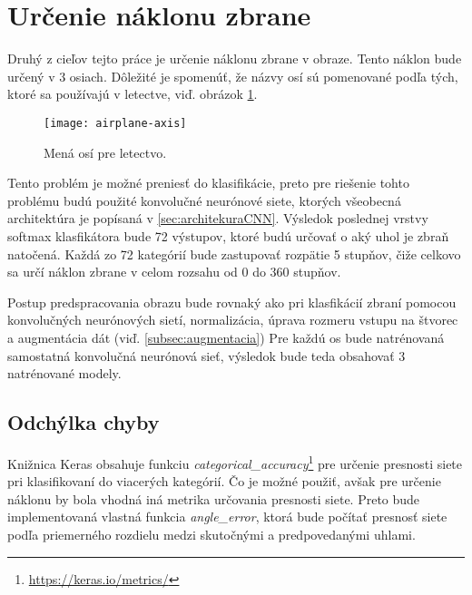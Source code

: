 
\section{Určenie náklonu zbrane}
\label{sec:urcenienaklonuzbrane}
Druhý z cieľov tejto práce je určenie náklonu zbrane v obraze.
Tento náklon bude určený v 3 osiach.
Dôležité je spomenúť, že názvy osí sú pomenované podľa tých, ktoré sa používajú v letectve, viď. obrázok \ref{pic:airplaneaxis}.
\begin{figure}[H]
    \centering
    \texttt{[image: airplane-axis]}
    \caption{Mená osí pre letectvo.}
    \label{pic:airplaneaxis}
\end{figure}

Tento problém je možné preniesť do klasifikácie, preto pre riešenie tohto problému budú použité konvolučné neurónové siete, ktorých všeobecná architektúra je popísaná v \ref{sec:architekuraCNN}.
Výsledok poslednej vrstvy softmax klasfikátora bude 72 výstupov, ktoré budú určovať o aký uhol je zbraň natočená.
Každá zo 72 kategórií bude zastupovať rozpätie 5 stupňov, čiže celkovo sa určí náklon zbrane v celom rozsahu od 0 do 360 stupňov.

Postup predspracovania obrazu bude rovnaký ako pri klasfikácií zbraní pomocou konvolučných neurónových sietí, normalizácia, úprava rozmeru vstupu na štvorec a augmentácia dát (viď. \ref{subsec:augmentacia})
Pre každú os bude natrénovaná samostatná konvolučná neurónová sieť, výsledok bude teda obsahovať 3 natrénované modely.

\subsection{Odchýlka chyby}
\label{subsec:odchylkachyby}
Knižnica Keras obsahuje funkciu \textit{categorical\_accuracy}\footnote{\url{https://keras.io/metrics/}} pre určenie presnosti siete pri klasifikovaní do viacerých kategórií.
Čo je možné použiť, avšak pre určenie náklonu by bola vhodná iná metrika určovania presnosti siete.
Preto bude implementovaná vlastná funkcia \textit{angle\_error}, ktorá bude počítať presnosť siete podľa priemerného rozdielu medzi skutočnými a predpovedanými uhlami.
